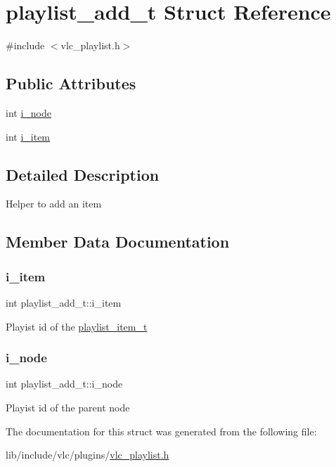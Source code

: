 \hypertarget{structplaylist__add__t}{}\section{playlist\+\_\+add\+\_\+t Struct Reference}
\label{structplaylist__add__t}


{\ttfamily \#include $<$vlc\+\_\+playlist.\+h$>$}

\subsection*{Public Attributes}
\begin{DoxyCompactItemize}
\item 
int \hyperlink{structplaylist__add__t_a49016b2e95ea3485f2482cf0419bd9df}{i\+\_\+node}
\item 
int \hyperlink{structplaylist__add__t_a7cd9577ad52b77731c1e9c1cf325dd6c}{i\+\_\+item}
\end{DoxyCompactItemize}


\subsection{Detailed Description}
Helper to add an item 

\subsection{Member Data Documentation}
\mbox{\label{structplaylist__add__t_a7cd9577ad52b77731c1e9c1cf325dd6c}} 
\subsubsection{\texorpdfstring{i\+\_\+item}{i\_item}}
{\footnotesize\ttfamily int playlist\+\_\+add\+\_\+t\+::i\+\_\+item}

Playist id of the \hyperlink{structplaylist__item__t}{playlist\+\_\+item\+\_\+t} \mbox{\label{structplaylist__add__t_a49016b2e95ea3485f2482cf0419bd9df}} 
\subsubsection{\texorpdfstring{i\+\_\+node}{i\_node}}
{\footnotesize\ttfamily int playlist\+\_\+add\+\_\+t\+::i\+\_\+node}

Playist id of the parent node 

The documentation for this struct was generated from the following file\+:\begin{DoxyCompactItemize}
\item 
lib/include/vlc/plugins/\hyperlink{vlc__playlist_8h}{vlc\+\_\+playlist.\+h}\end{DoxyCompactItemize}
